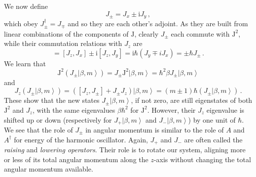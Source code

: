 \documentclass{article}
\theoremstyle{plain}\theoremheaderfont{\normalfont\itshape}\theorembodyfont{\rmfamily}\theoremseparator{.}\newtheorem*{rem}{Remark}\newtheorem*{ex}{Example}\newtheorem*{proof}{Proof}\newtheorem*{altp}{Alternative proof}
\theoremstyle{plain}\theoremheaderfont{\normalfont\bfseries}\theorembodyfont{\rmfamily}\theoremseparator{.}\newtheorem{thm}{Theorem}[section]\newtheorem{lem}[thm]{Lemma}\newtheorem{prop}[thm]{Proposition}\newtheorem*{cor}{Corollary}\newtheorem{defn}[thm]{Definition}\newtheorem{clm}[thm]{Claim}\newtheorem{clminproof}{Claim}
\theoremstyle{break}\theoremheaderfont{\normalfont\itshape}\theorembodyfont{\rmfamily}\theoremseparator{.\medskip}\newtheorem*{proofskip}{Proof}\newtheorem*{exs}{Examples}\newtheorem*{rems}{Remarks}
\theoremstyle{break}\theoremheaderfont{\normalfont\bfseries}\theorembodyfont{\rmfamily}\theoremseparator{.\medskip}\newtheorem{lemskip}[thm]{Lemma}\newtheorem{defnskip}[thm]{Definition}\newtheorem{propskip}[thm]{Proposition}\newtheorem{thmskip}[thm]{Theorem}
\numberwithin{equation}{section}
\newcommand{\ii}{\mathrm{i}}
\newcommand{\ket}[1]{\left| #1 \right\rangle}
\newcommand{\vb}[1]{\bm{\mathrm{#1}}}
\begin{document}
    We now define
    \begin{equation}
        J_{\pm}=J_{x}\pm \ii J_y\,,
    \end{equation}
    which obey \(J_\pm^\dagger=J_\mp\) and so they are each other's adjoint. As they are built from linear combinations of the components of \(\vb{J}\), clearly \(J_\pm\) each commute with \(\vb{J}^2\), while their commutation relations with \(J_z\) are
    \begin{equation}
        [J_z,J_\pm]=[J_z,J_x]\pm \ii[J_z,J_y]=\ii\hbar(J_y\mp iJ_x)=\pm\hbar J_\pm\,.
    \end{equation}
    We learn that
    \begin{equation}
        \vb{J}^2(J_\pm\ket{\beta,m})=J_\pm\vb{J}^2\ket{\beta,m}=\hbar^2\beta J_\pm \ket{\beta,m}
    \end{equation}
    and
    \begin{equation}
        J_z(J_\pm\ket{\beta,m})=([J_z,J_\pm]+J_\pm J_z)\ket{\beta,m}=(m\pm 1)\hbar(J_\pm\ket{\beta,m})\,.
    \end{equation}
    These show that the new states \(J_\pm\ket{\beta,m}\), if not zero, are still eigenstates of both \(\vb{J}^2\) and \(J_z\), with the same eigenvalues \(\beta\hbar^2\) for \(\vb{J}^2\). However, their \(J_z\) eigenvalue is shifted up or down (respectively for \(J_+\ket{\beta,m}\) and \(J_-\ket{\beta,m}\)) by one unit of \(\hbar\). We see that the role of \(J_\pm\) in angular momentum is similar to the role of \(A\) and \(A^\dagger\) for energy of the harmonic oscillator. Again, \(J_+\) and \(J_-\) are often called the \textit{raising} and \textit{lowering operators}. Their role is to rotate our system, aligning more or less of its total angular momentum along the \(z\)-axis without
    changing the total angular momentum available.
\end{document}
